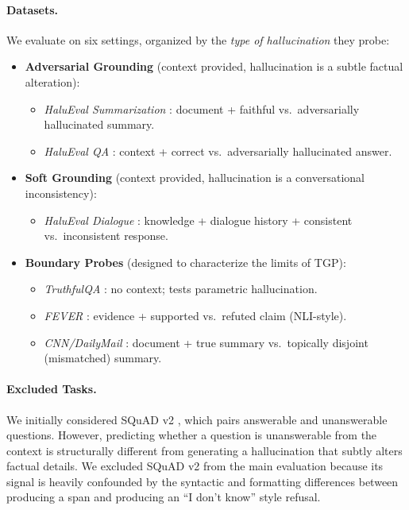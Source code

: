 \documentclass[10pt]{article}
\newcommand{\tgp}{\textsc{TGP}\xspace}
\begin{document}
\paragraph{Datasets.}
We evaluate on six settings, organized by the \emph{type of hallucination} they probe:

\begin{itemize}[nosep,leftmargin=*]
    \item \textbf{Adversarial Grounding} (context provided, hallucination is a subtle factual alteration):
    \begin{itemize}[nosep]
        \item \textit{HaluEval Summarization} \citep{li2023halueval}: document + faithful vs.\ adversarially hallucinated summary.
        \item \textit{HaluEval QA} \citep{li2023halueval}: context + correct vs.\ adversarially hallucinated answer.
    \end{itemize}
    \item \textbf{Soft Grounding} (context provided, hallucination is a conversational inconsistency):
    \begin{itemize}[nosep]
        \item \textit{HaluEval Dialogue} \citep{li2023halueval}: knowledge + dialogue history + consistent vs.\ inconsistent response.
    \end{itemize}
    \item \textbf{Boundary Probes} (designed to characterize the limits of \tgp):
    \begin{itemize}[nosep]
        \item \textit{TruthfulQA} \citep{lin2022truthfulqa}: no context; tests parametric hallucination.
        \item \textit{FEVER} \citep{thorne2018fever}: evidence + supported vs.\ refuted claim (NLI-style).
        \item \textit{CNN/DailyMail} \citep{hermann2015teaching}: document + true summary vs.\ topically disjoint (mismatched) summary.
    \end{itemize}
\end{itemize}

\paragraph{Excluded Tasks.}
We initially considered SQuAD v2 \citep{rajpurkar2018know}, which pairs answerable and unanswerable questions. However, predicting whether a question is unanswerable from the context is structurally different from generating a hallucination that subtly alters factual details. We excluded SQuAD v2 from the main evaluation because its signal is heavily confounded by the syntactic and formatting differences between producing a span and producing an ``I don't know'' style refusal.
\end{document}
